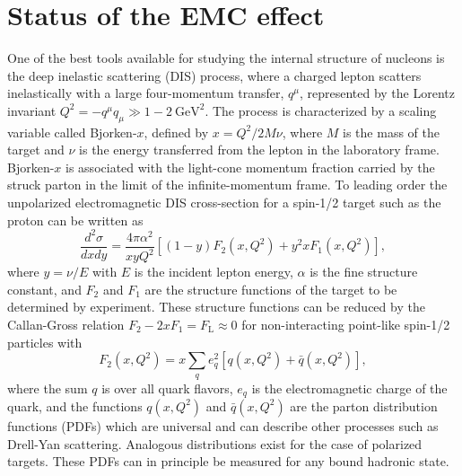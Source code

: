 \section{Status of the EMC effect\label{sec:status}}
%
One of the best tools available for studying the internal structure of nucleons is the deep inelastic
scattering (DIS) process, where a charged lepton scatters inelastically with a large four-momentum
transfer, $q^\mu$, represented by the Lorentz invariant $Q^2 = -q^\mu q_\mu \gg 1-2~\mathrm{GeV}^2$.
The process is characterized by a scaling variable called Bjorken-$x$, defined by $x = Q^2/2M \nu$, 
where $M$ is the mass of the target and $\nu$ is the energy transferred from the lepton in the laboratory frame. Bjorken-$x$ is associated with the light-cone momentum fraction carried by the struck parton in the limit of the infinite-momentum frame. To leading order the unpolarized electromagnetic DIS cross-section for a spin-1/2 target such as the proton can be written as~\cite{PhysRevD.98.030001}
%
\begin{equation}
\frac{d^2 \sigma}{dx dy} = \frac{4 \pi \alpha^2}{x y Q^2} \left[ (1-y)F_2(x, Q^2) + y^2 x F_1(x, Q^2) \right],
\end{equation}
%
where $y = \nu/E$ with $E$ is the incident lepton energy, $\alpha$ is the fine structure constant, and $F_2$
and $F_1$ are the structure functions of the target to be determined by experiment. These structure functions can be reduced by the Callan-Gross relation $F_2 - 2xF_1 = F_\mathrm{L} \approx 0$ for non-interacting point-like spin-1/2 particles with
%
\begin{equation}
F_2(x,Q^2) = x \sum_{q} e_q^2 \left[q(x,Q^2) + \bar{q}(x,Q^2)\right],
\end{equation}
where the sum $q$ is over all quark flavors,  $e_q$ is the electromagnetic charge of the quark, and the
functions $q(x,Q^2)$ and $\bar{q}(x,Q^2)$ are the parton distribution functions (PDFs) which are universal and can describe other processes such as Drell-Yan scattering.  Analogous distributions exist for the case of polarized targets. These PDFs can in principle be measured for any bound hadronic state.

